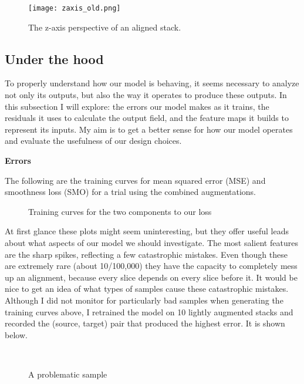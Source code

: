\documentclass[12pt,a4paper]{article}
\begin{document}
\vspace{0.5cm}

\begin{figure}[h!]
\centering
\texttt{[image: zaxis\_old.png]}
\caption{\label{fig:zaxis} The z-axis perspective of an aligned stack.}
\end{figure}

\subsection{Under the hood}

To properly understand how our model is behaving, it seems necessary to analyze not only its outputs, but also the way it operates to produce these outputs. In this subsection I will explore: the errors our model makes as it trains, the residuals it uses to calculate the output field, and the feature maps it builds to represent its inputs. My aim is to get a better sense for how our model operates and evaluate the usefulness of our design choices. 

{\bf Errors}

The following are the training curves for mean squared error (MSE) and smoothness loss (SMO) for a trial using the combined augmentations. 

\vspace{0.5cm}

\begin{figure}[ht]%
    \centering
	\qquad
    \caption{Training curves for the two components to our loss}%
\end{figure}

At first glance these plots might seem uninteresting, but they offer useful leads about what aspects of our model we should investigate. The most salient features are the sharp spikes, reflecting a few catastrophic mistakes. Even though these are extremely rare (about 10/100,000) they have the capacity to completely mess up an alignment, because every slice depends on every slice before it. It would be nice to get an idea of what types of samples cause these catastrophic mistakes. Although I did not monitor for particularly bad samples when generating the training curves above, I retrained the model on 10 lightly augmented stacks and recorded the (source, target) pair that produced the highest error. It is shown below.

\begin{figure}[ht]%
    \centering
	\qquad
     \\
	\qquad
    \caption{A problematic sample}%
\end{figure}
\end{document}
